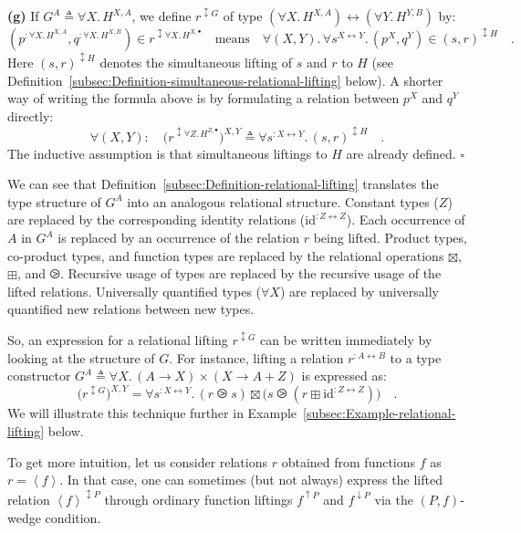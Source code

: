 \textbf{(g)} If $G^{A}\triangleq\forall X.\,H^{X,A}$, we define $r^{\updownarrow G}$
of type $(\forall X.\,H^{X,A})\leftrightarrow(\forall Y.\,H^{Y,B})$
by:
\[
(p^{:\forall X.\,H^{X,A}},q^{:\forall X.\,H^{X,B}})\in r^{\updownarrow\forall X.\,H^{X,\bullet}}\quad\text{means}\quad\forall(X,Y).\,\forall s^{X\leftrightarrow Y}.\,(p^{X},q^{Y})\in(s,r)^{\updownarrow H}\quad.
\]
Here $(s,r)^{\updownarrow H}$ denotes the simultaneous lifting of
$s$ and $r$ to $H$ (see Definition~\ref{subsec:Definition-simultaneous-relational-lifting}
below). A shorter way of writing the formula above is by formulating
a relation between $p^{X}$ and $q^{Y}$ directly:
\begin{equation}
\forall(X,Y):\quad\big(r^{\updownarrow\forall Z.\,H^{Z,\bullet}}\big)^{X,Y}\triangleq\forall s^{:X\leftrightarrow Y}.\,(s,r)^{\updownarrow H}\quad.\label{eq:relational-lifting-quantified-types-short}
\end{equation}
The inductive assumption is that simultaneous liftings to $H$ are
already defined. $\square$

We can see that Definition~\ref{subsec:Definition-relational-lifting}
translates the type structure of $G^{A}$ into an analogous relational
structure. Constant types ($Z$) are replaced by the corresponding
identity relations ($\text{id}^{:Z\leftrightarrow Z}$). Each occurrence
of $A$ in $G^{A}$ is replaced by an occurrence of the relation $r$
being lifted. Product types, co-product types, and function types
are replaced by the relational operations $\boxtimes$, $\boxplus$,
and $\ogreaterthan$. Recursive usage of types are replaced by the
recursive usage of the lifted relations. Universally quantified types
($\forall X$) are replaced by universally quantified new relations
between new types. 

So, an expression for a relational lifting $r^{\updownarrow G}$ can
be written immediately by looking at the structure of $G$. For instance,
lifting a relation $r^{:A\leftrightarrow B}$ to a type constructor
$G^{A}\triangleq\forall X.\,\left(A\rightarrow X\right)\times\left(X\rightarrow A+Z\right)$
is expressed as:
\[
\big(r^{\updownarrow G}\big)^{X,Y}=\forall s^{:X\leftrightarrow Y}.\,(r\ogreaterthan s)\boxtimes\big(s\ogreaterthan(r\boxplus\text{id}^{:Z\leftrightarrow Z})\big)\quad.
\]
 We will illustrate this technique further in Example~\ref{subsec:Example-relational-lifting}
below.

To get more intuition, let us consider relations $r$ obtained from
functions $f$ as $r=\left<f\right>$. In that case, one can sometimes
(but not always) express the lifted relation $\left<f\right>^{\updownarrow P}$
through ordinary function liftings $f^{\uparrow P}$ and $f^{\downarrow P}$
via the $\left(P,f\right)$-wedge condition.

